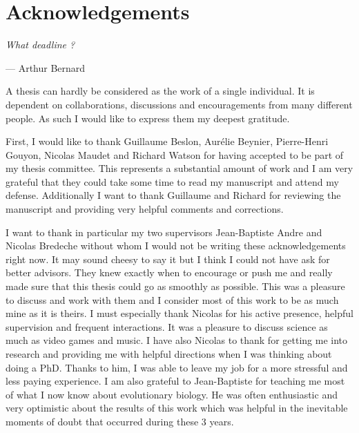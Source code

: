 \chapter*{Acknowledgements}


\epigraph{\textit{\hfill What deadline ?}}{--- \textup{Arthur Bernard}}

A thesis can hardly be considered as the work of a single individual. It is dependent on collaborations, discussions and encouragements from many different people. As such I would like to express them my deepest gratitude.

First, I would like to thank Guillaume Beslon, Aurélie Beynier, Pierre-Henri Gouyon, Nicolas Maudet and Richard Watson for having accepted to be part of my thesis committee. This represents a substantial amount of work and I am very grateful that they could take some time to read my manuscript and attend my defense. Additionally I want to thank Guillaume and Richard for reviewing the manuscript and providing very helpful comments and corrections.

I want to thank in particular my two supervisors Jean-Baptiste Andre and Nicolas Bredeche without whom I would not be writing these acknowledgements right now. It may sound cheesy to say it but I think I could not have ask for better advisors. They knew exactly when to encourage or push me and really made sure that this thesis could go as smoothly as possible. This was a pleasure to discuss and work with them and I consider most of this work to be as much mine as it is theirs. I must especially thank Nicolas for his active presence, helpful supervision and frequent interactions. It was a pleasure to discuss science as much as video games and music. I have also Nicolas to thank for getting me into research and providing me with helpful directions when I was thinking about doing a PhD. Thanks to him, I was able to leave my job for a more stressful and less paying experience. I am also grateful to Jean-Baptiste for teaching me most of what I now know about evolutionary biology. He was often enthusiastic and very optimistic about the results of this work which was helpful in the inevitable moments of doubt that occurred during these 3 years.

